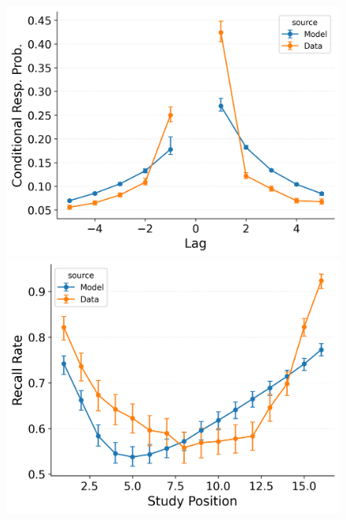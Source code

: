 \documentclass[
  man,
  floatsintext,
  longtable,
  nolmodern,
  notxfonts,
  notimes,
  draftfirst,
  colorlinks=true,linkcolor=blue,citecolor=blue,urlcolor=blue]{apa7}
\begin{document}
\begin{figure}
\begin{minipage}{0.33\linewidth}
\includegraphics{figures/HealeyKahana2014_CRU_with_Feature-to-Context__Primacy__and_StartDrift_Fitting_crp.png}\end{minipage}%
%
\begin{minipage}{0.33\linewidth}
\includegraphics{figures/HealeyKahana2014_CRU_with_Feature-to-Context__Primacy__and_StartDrift_Fitting_spc.png}\end{minipage}%
\newline
\begin{minipage}{0.33\linewidth}

\end{minipage}
\end{figure}
\end{document}
